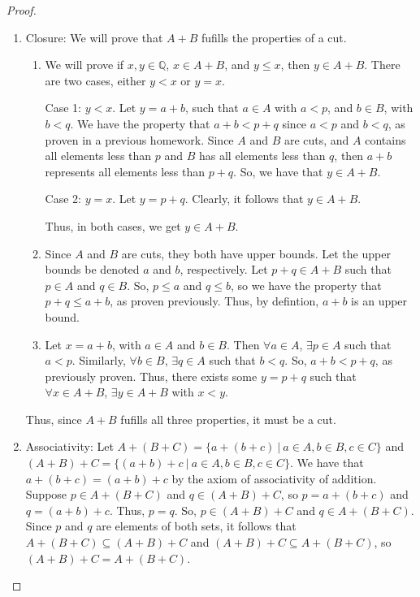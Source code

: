 \documentclass{article}
\theoremstyle{definition}
\newcommand{\Q}{\mathbb{Q}}
\begin{document}
\begin{proof}
\begin{enumerate}

\item Closure: We will prove that $A + B$ fufills the properties of a cut. 
\begin{enumerate}
\item We will prove if $x, y \in \Q$, $x \in A+B$, and $ y \leq x$, then $y \in A + B$. There are two cases, either $y < x$ or $y = x$. 

Case 1: $y < x$. Let $y = a + b$, such that $a \in A$ with $a < p$, and $b \in B$, with $b < q$. We have the property that $a + b < p + q$ since $a < p$ and $b < q$, as proven in a previous homework. Since $A$ and $B$ are cuts, and $A$ contains all elements less than $p$ and $B$ has all elements less than $q$, then $a + b$ represents all elements less than $p + q$. So, we have that $y \in A + B$. 

Case 2: $y = x$. Let $y = p + q$. Clearly, it follows that $y \in A + B$. 

Thus, in both cases, we get $y \in A + B$. 

\item Since $A$ and $B$ are cuts, they both have upper bounds. Let the upper bounds be denoted $a$ and $b$, respectively. Let $p + q \in A + B$ such that $p \in A$ and $q \in B$. So, $ p \leq a$ and $q \leq b$, so we have the property that $p + q \leq a + b$, as proven previously. Thus, by defintion, $a + b$ is an upper bound. 

\item Let $x = a + b$, with $a \in A$ and $b \in B$. Then $\forall a \in A$, $\exists p \in A$ such that $a < p$. Similarly, $\forall b \in B$, $\exists q \in A$ such that $b < q$. So, $ a+ b < p + q$, as previously proven. Thus, there exists some $y = p + q$ such that $\forall x \in A + B$, $\exists y \in A + B$ with $x < y$.  
\end{enumerate}
Thus, since $A+B$ fufills all three properties, it must be a cut. 

\item Associativity: Let $A + (B + C) = \{a + (b + c)\ |\ a \in A, b \in B , c \in C\}$ and $(A + B) + C = \{(a + b) + c\ |\ a \in A, b \in B , c \in C\}$. We have that $a + (b + c) = (a + b) + c$ by the axiom of associativity of addition. Suppose $p \in A + (B + C)$ and $q \in (A + B) + C$, so $ p = a + (b + c)$ and $q = (a + b) + c$. Thus, $p= q$. So, $ p \in (A + B) + C $ and $q \in A + (B + C)$. Since $p$ and $q$ are elements of both sets, it follows that $A + (B + C) \subseteq (A + B) + C$ and $(A + B) + C \subseteq A + (B + C) $, so $(A + B) + C = A + (B + C) $. 


\end{enumerate}
\end{proof}
\end{document}

